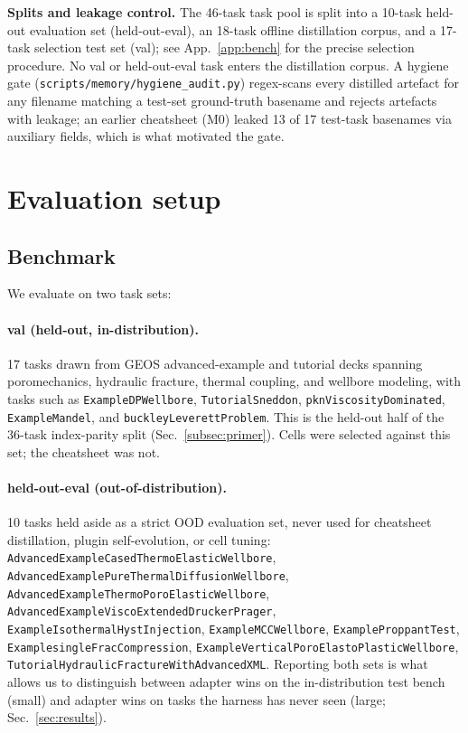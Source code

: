 \documentclass{article}
\begin{document}
\textbf{Splits and leakage control.} The 46-task task pool is split into a 10-task held-out evaluation set (held-out-eval), an 18-task offline distillation corpus, and a 17-task selection test set (val); see App.~\ref{app:bench} for the precise selection procedure. No val or held-out-eval task enters the distillation corpus. A hygiene gate (\texttt{scripts/memory/hygiene\_audit.py}) regex-scans every distilled artefact for any filename matching a test-set ground-truth basename and rejects artefacts with leakage; an earlier cheatsheet (M0) leaked 13 of 17 test-task basenames via auxiliary fields, which is what motivated the gate.


\section{Evaluation setup}
\label{sec:eval}

\subsection{Benchmark}
\label{subsec:bench-summary}

We evaluate on two task sets:

\paragraph{val (held-out, in-distribution).} 17 tasks drawn from GEOS advanced-example and tutorial decks spanning poromechanics, hydraulic fracture, thermal coupling, and wellbore modeling, with tasks such as \texttt{ExampleDPWellbore}, \texttt{TutorialSneddon}, \texttt{pknViscosityDominated}, \texttt{ExampleMandel}, and \texttt{buckleyLeverettProblem}. This is the held-out half of the 36-task index-parity split (Sec.~\ref{subsec:primer}). Cells were selected against this set; the cheatsheet was not.

\paragraph{held-out-eval (out-of-distribution).}\label{subsec:held-out-set} 10 tasks held aside as a strict OOD evaluation set, never used for cheatsheet distillation, plugin self-evolution, or cell tuning: \texttt{AdvancedExampleCasedThermoElasticWellbore}, \texttt{AdvancedExamplePureThermalDiffusionWellbore}, \texttt{AdvancedExampleThermoPoroElasticWellbore}, \texttt{AdvancedExampleViscoExtendedDruckerPrager}, \texttt{ExampleIsothermalHystInjection}, \texttt{ExampleMCCWellbore}, \texttt{ExampleProppantTest}, \texttt{ExamplesingleFracCompression}, \texttt{ExampleVerticalPoroElastoPlasticWellbore}, \texttt{TutorialHydraulicFractureWithAdvancedXML}. Reporting both sets is what allows us to distinguish between adapter wins on the in-distribution test bench (small) and adapter wins on tasks the harness has never seen (large; Sec.~\ref{sec:results}).
\end{document}
